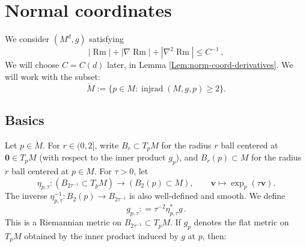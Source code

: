 \documentclass[11pt, letterpaper, reqno]{amsart}
\numberwithin{equation}{section}
\theoremstyle{remark}
\newcommand{\mbfv}{\mathbf{v}}
\newcommand{\injrad}{\operatorname{injrad}}
\newcommand{\Rm}{\operatorname{Rm}}
\newcommand{\orig}{\mathbf{0}}
\begin{document}

\section{Normal coordinates} \label{app:normal.coordinates}

We consider $(M^d,g)$ satisfying
\begin{equation}\label{eq:curv-assumption-app}
|\Rm| + |\nabla \Rm| + |\nabla^2\Rm| \leq C^{-1} \, ,
\end{equation}
We will choose $C = C(d)$ later, in Lemma \ref{Lem:norm-coord-derivatives}. We will work with the subset:
\[ \breve M := \{ p \in M : \injrad(M, g, p) \geq 2 \}. \]

\subsection{Basics} 

Let $p \in \breve M$. For $r \in (0, 2]$, write $B_r \subset T_pM$ for the radius $r$ ball centered at $\orig \in T_p M$ (with respect to the inner product $g_p$), and $B_r(p) \subset M$ for the radius $r$ ball centered at $p \in M$. For $\tau > 0$, let
\begin{equation}\label{eq:defn-eta-tau}
\eta_{p,\tau} : (B_{2\tau^{-1}} \subset T_p M) \to (B_2(p) \subset M), \qquad \mbfv \mapsto \exp_p(\tau \mbfv).
\end{equation}
The inverse $\eta_{p,\tau}^{-1} : B_2 (p) \to B_{2\tau^{-1}}$ is also well-defined and smooth. We define 
\begin{equation}\label{eq:defn-g-tau}
g_{p,\tau} : = \tau^{-2} \eta_{p,\tau}^*g \, .
\end{equation} 
This is a Riemannian metric on $B_{2\tau^{-1}} \subset T_p M$. If $g_p$ denotes the flat metric on $T_p M$ obtained by the inner product induced by $g$ at $p$, then:
\end{document}
